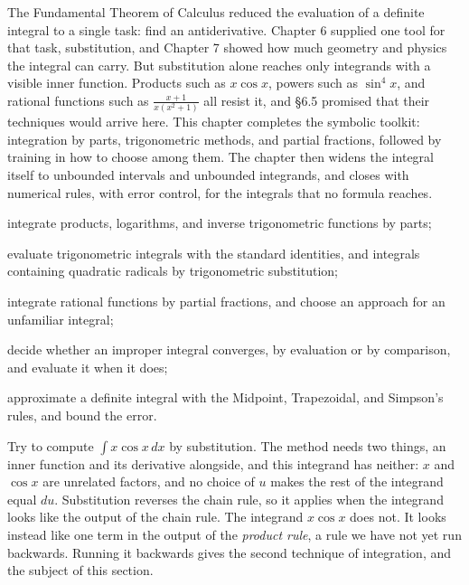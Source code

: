 \documentclass[a4paper,12pt,oneside]{memoir}
\begin{document}
\begin{lead}
The Fundamental Theorem of Calculus reduced the evaluation of a definite integral to a single task: find an antiderivative. Chapter 6 supplied one tool for that task, substitution, and Chapter 7 showed how much geometry and physics the integral can carry. But substitution alone reaches only integrands with a visible inner function. Products such as \(x\cos x\), powers such as \(\sin^4 x\), and rational functions such as \(\tfrac{x+1}{x(x^2+1)}\) all resist it, and §6.5 promised that their techniques would arrive here. This chapter completes the symbolic toolkit: integration by parts, trigonometric methods, and partial fractions, followed by training in how to choose among them. The chapter then widens the integral itself to unbounded intervals and unbounded integrands, and closes with numerical rules, with error control, for the integrals that no formula reaches.
\end{lead}
\begin{objectives}
  \item integrate products, logarithms, and inverse trigonometric functions by parts;
  \item evaluate trigonometric integrals with the standard identities, and integrals containing quadratic radicals by trigonometric substitution;
  \item integrate rational functions by partial fractions, and choose an approach for an unfamiliar integral;
  \item decide whether an improper integral converges, by evaluation or by comparison, and evaluate it when it does;
  \item approximate a definite integral with the Midpoint, Trapezoidal, and Simpson’s rules, and bound the error.
\end{objectives}
Try to compute \(\int x\cos x\,dx\) by substitution. The method needs two things, an inner function and its derivative alongside, and this integrand has neither: \(x\) and \(\cos x\) are unrelated factors, and no choice of \(u\) makes the rest of the integrand equal \(du\). Substitution reverses the chain rule, so it applies when the integrand looks like the output of the chain rule. The integrand \(x \cos x\) does not. It looks instead like one term in the output of the \emph{product rule}, a rule we have not yet run backwards. Running it backwards gives the second technique of integration, and the subject of this section.
\end{document}
